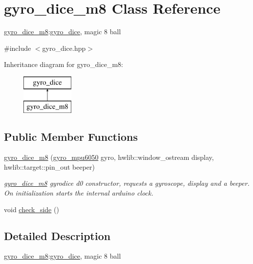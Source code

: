 \hypertarget{classgyro__dice__m8}{}\section{gyro\+\_\+dice\+\_\+m8 Class Reference}
\label{classgyro__dice__m8}


\hyperlink{classgyro__dice__m8}{gyro\+\_\+dice\+\_\+m8}\+:\hyperlink{classgyro__dice}{gyro\+\_\+dice}, magic 8 ball  




{\ttfamily \#include $<$gyro\+\_\+dice.\+hpp$>$}

Inheritance diagram for gyro\+\_\+dice\+\_\+m8\+:\begin{figure}[H]
\begin{center}
\leavevmode
\includegraphics[height=2.000000cm]{classgyro__dice__m8}
\end{center}
\end{figure}
\subsection*{Public Member Functions}
\begin{DoxyCompactItemize}
\item 
\mbox{\label{classgyro__dice__m8_ae0f1941a8ba15a6c5ff9be0d012747e2}} 
\hyperlink{classgyro__dice__m8_ae0f1941a8ba15a6c5ff9be0d012747e2}{gyro\+\_\+dice\+\_\+m8} (\hyperlink{classgyro__mpu6050}{gyro\+\_\+mpu6050} gyro, hwlib\+::window\+\_\+ostream display, hwlib\+::target\+::pin\+\_\+out beeper)
\begin{DoxyCompactList}\small\item\em \hyperlink{classgyro__dice__m8}{gyro\+\_\+dice\+\_\+m8} gyrodice d0 constructor, requests a gyroscope, display and a beeper. On initialization starts the internal arduino clock. \end{DoxyCompactList}\item 
void \hyperlink{classgyro__dice__m8_a1d81aad976c42ef5ac4f8867b0881ad4}{check\+\_\+side} ()
\end{DoxyCompactItemize}


\subsection{Detailed Description}
\hyperlink{classgyro__dice__m8}{gyro\+\_\+dice\+\_\+m8}\+:\hyperlink{classgyro__dice}{gyro\+\_\+dice}, magic 8 ball 

